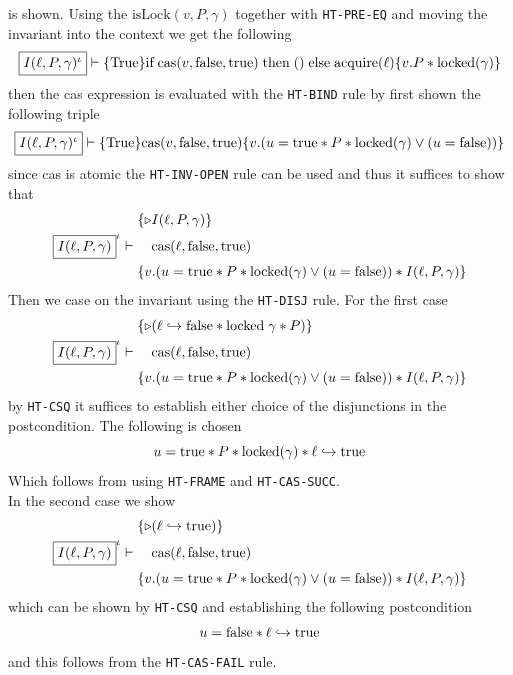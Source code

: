 \begin{enumerate}
\[  \]
  is shown. Using the $\text{isLock}(v,P,\gamma)$ together with \texttt{HT-PRE-EQ} and moving the invariant into the context we get the following
  \[
    \fbox{\ensuremath{I(\ell,P,\gamma)^\iota}} \vdash \{\text{True}\} \text{if} \; \text{cas} (v,\text{false},\text{true}) \; \text{then} \; () \; \text{else} \; \text{acquire}(\ell) \{v.P * \text{locked}(\gamma)\}
  \]
  then the cas expression is evaluated with the \texttt{HT-BIND} rule by first shown the following triple
  \[
    \fbox{\ensuremath{I(\ell,P,\gamma)^\iota}} \vdash \{\text{True}\} \text{cas} (v,\text{false},\text{true}) \{v.(u = \text{true} * P * \text{locked}(\gamma) \lor (u = \text{false}))\}
  \]
  since cas is atomic the \texttt{HT-INV-OPEN} rule can be used and thus it suffices to show that
  \begin{align*}
    &\{\triangleright I(\ell, P, \gamma)\} \\
    \fbox{\ensuremath{I(\ell, P, \gamma)}}^\iota \vdash \; & \quad \text{cas}(\ell, \text{false}, \text{true}) \\
    &\{v.(u = \text{true} * P * \text{locked}(\gamma) \lor (u = \text{false})) * I(\ell, P, \gamma)\}
  \end{align*}
  Then we case on the invariant using the \texttt{HT-DISJ} rule. For the first case
  \begin{align*}
    &\{\triangleright (\ell \hookrightarrow \text{false} * \text{locked} \; \gamma * P)\} \\
    \fbox{\ensuremath{I(\ell, P, \gamma)}}^\iota \vdash \; & \quad \text{cas}(\ell, \text{false}, \text{true}) \\
    &\{v.(u = \text{true} * P * \text{locked}(\gamma) \lor (u = \text{false})) * I(\ell, P, \gamma)\}
  \end{align*}
  by \texttt{HT-CSQ} it suffices to establish either choice of the disjunctions in the postcondition. The following is chosen
  \[
    u = \text{true} * P * \text{locked}(\gamma) * \ell \hookrightarrow \text{true} 
  \]
  Which follows from using \texttt{HT-FRAME} and \texttt{HT-CAS-SUCC}. \smallskip \\
  In the second case we show
  \begin{align*}
    &\{\triangleright (\ell \hookrightarrow \text{true})\} \\
    \fbox{\ensuremath{I(\ell, P, \gamma)}}^\iota \vdash \; & \quad \text{cas}(\ell, \text{false}, \text{true}) \\
    &\{v.(u = \text{true} * P * \text{locked}(\gamma) \lor (u = \text{false})) * I(\ell, P, \gamma)\}
  \end{align*}
  which can be shown by \texttt{HT-CSQ} and establishing the following postcondition
  \[
    u = \text{false} * \ell \hookrightarrow \text{true} 
  \]
  and this follows from the \texttt{HT-CAS-FAIL} rule. \smallskip \\

\end{enumerate}

